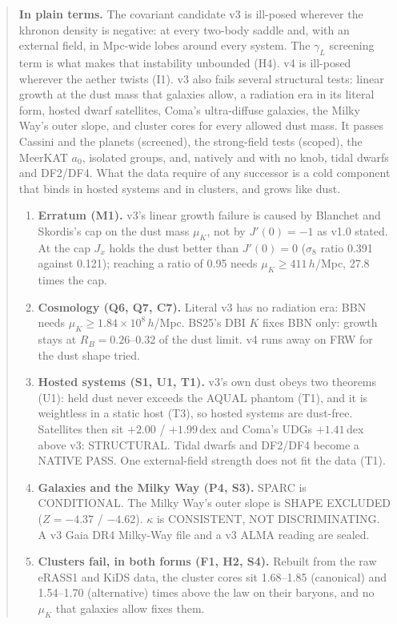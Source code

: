 \documentclass[10pt]{article}
\begin{document}
\begin{abstract}
\textbf{In plain terms.} The covariant candidate v3 is ill-posed wherever the khronon density is negative: at every two-body saddle and, with an external field, in Mpc-wide lobes around every system. The $\gamma_L$ screening term is what makes that instability unbounded (H4). v4 is ill-posed wherever the aether twists (I1). v3 also fails several structural tests: linear growth at the dust mass that galaxies allow, a radiation era in its literal form, hosted dwarf satellites, Coma's ultra-diffuse galaxies, the Milky Way's outer slope, and cluster cores for every allowed dust mass. It passes Cassini and the planets (screened), the strong-field tests (scoped), the MeerKAT $a_0$, isolated groups, and, natively and with no knob, tidal dwarfs and DF2/DF4. What the data require of any successor is a cold component that binds in hosted systems and in clusters, and grows like dust.
\begin{enumerate}
\item \textbf{Erratum (M1).} v3's linear growth failure is caused by Blanchet and Skordis's cap on the dust mass $\mu_K$, not by $J'(0)=-1$ as v1.0 stated. At the cap $J_x$ holds the dust better than $J'(0)=0$ ($\sigma_8$ ratio 0.391 against 0.121); reaching a ratio of 0.95 needs $\mu_K\ge411\,h$/Mpc, 27.8 times the cap.
\item \textbf{Cosmology (Q6, Q7, C7).} Literal v3 has no radiation era: BBN needs $\mu_K\ge1.84\times10^{8}\,h$/Mpc. BS25's DBI $K$ fixes BBN only: growth stays at $R_B=0.26$--0.32 of the dust limit. v4 runs away on FRW for the dust shape tried.
\item \textbf{Hosted systems (S1, U1, T1).} v3's own dust obeys two theorems (U1): held dust never exceeds the AQUAL phantom (T1), and it is weightless in a static host (T3), so hosted systems are dust-free. Satellites then sit $+2.00$ / $+1.99$\,dex and Coma's UDGs $+1.41$\,dex above v3: STRUCTURAL. Tidal dwarfs and DF2/DF4 become a NATIVE PASS. One external-field strength does not fit the data (T1).
\item \textbf{Galaxies and the Milky Way (P4, S3).} SPARC is CONDITIONAL. The Milky Way's outer slope is SHAPE EXCLUDED ($Z=-4.37$ / $-4.62$). $\kappa$ is CONSISTENT, NOT DISCRIMINATING. A v3 Gaia DR4 Milky-Way file and a v3 ALMA reading are sealed.
\item \textbf{Clusters fail, in both forms (F1, H2, S4).} Rebuilt from the raw eRASS1 and KiDS data, the cluster cores sit 1.68--1.85 (canonical) and 1.54--1.70 (alternative) times above the law on their baryons, and no $\mu_K$ that galaxies allow fixes them.

\end{enumerate}
\end{abstract}
\end{document}
